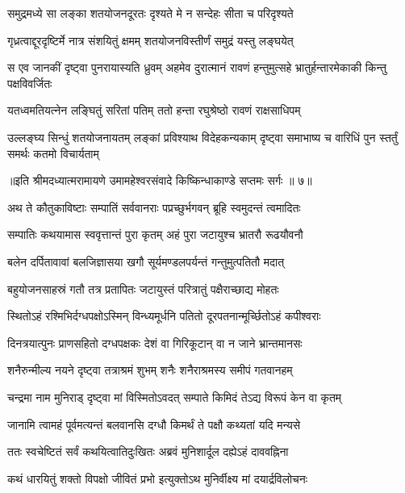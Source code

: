 \twolineshloka
{समुद्रमध्ये सा लङ्का शतयोजनदूरतः}
{दृश्यते मे न सन्देहः सीता च परिदृश्यते} %

\twolineshloka
{गृध्रत्वाद्दूरदृष्टिर्मे नात्र संशयितुं क्षमम्}
{शतयोजनविस्तीर्णं समुद्रं यस्तु लङ्घयेत्} %

\threelineshloka
{स एव जानकीं दृष्ट्वा पुनरायास्यति ध्रुवम्}
{अहमेव दुरात्मानं रावणं हन्तुमुत्सहे}
{भ्रातुर्हन्तारमेकाकी किन्तु पक्षविवर्जितः} %

\twolineshloka
{यतध्वमतियत्नेन लङ्घितुं सरितां पतिम्}
{ततो हन्ता रघुश्रेष्ठो रावणं राक्षसाधिपम्} %

\fourlineindentedshloka
{उल्लङ्घ्य सिन्धुं शतयोजनायतम्}
{लङ्कां प्रविश्याथ विदेहकन्यकाम्}
{दृष्ट्वा समाभाष्य च वारिधिं पुन\-}
{स्तर्तुं समर्थः कतमो विचार्यताम्} %

{॥इति श्रीमदध्यात्मरामायणे उमामहेश्वरसंवादे किष्किन्धाकाण्डे
सप्तमः सर्गः ॥ ७॥
}




\twolineshloka
{अथ ते कौतुकाविष्टाः सम्पातिं सर्ववानराः}
{पप्रच्छुर्भगवन् ब्रूहि स्वमुदन्तं त्वमादितः} %

\twolineshloka
{सम्पातिः कथयामास स्ववृत्तान्तं पुरा कृतम्}
{अहं पुरा जटायुश्च भ्रातरौ रूढयौवनौ} %

\twolineshloka
{बलेन दर्पितावावां बलजिज्ञासया खगौ}
{सूर्यमण्डलपर्यन्तं गन्तुमुत्पतितौ मदात्} %

\twolineshloka
{बहुयोजनसाहस्रं गतौ तत्र प्रतापितः}
{जटायुस्तं परित्रातुं पक्षैराच्छाद्य मोहतः} %

\twolineshloka
{स्थितोऽहं रश्मिभिर्दग्धपक्षोऽस्मिन् विन्ध्यमूर्धनि}
{पतितो दूरपतनान्मूर्च्छितोऽहं कपीश्वराः} %

\twolineshloka
{दिनत्रयात्पुनः प्राणसहितो दग्धपक्षकः}
{देशं वा गिरिकूटान् वा न जाने भ्रान्तमानसः} %

\twolineshloka
{शनैरुन्मील्य नयने दृष्ट्वा तत्राश्रमं शुभम्}
{शनैः शनैराश्रमस्य समीपं गतवानहम्} %

\twolineshloka
{चन्द्रमा नाम मुनिराड् दृष्ट्वा मां विस्मितोऽवदत्}
{सम्पाते किमिदं तेऽद्य विरूपं केन वा कृतम्} %

\twolineshloka
{जानामि त्वामहं पूर्वमत्यन्तं बलवानसि}
{दग्धौ किमर्थं ते पक्षौ कथ्यतां यदि मन्यसे} %

\twolineshloka
{ततः स्वचेष्टितं सर्वं कथयित्वातिदुःखितः}
{अब्रवं मुनिशार्दूल दह्येऽहं दाववह्निना} %

\twolineshloka
{कथं धारयितुं शक्तो विपक्षो जीवितं प्रभो}
{इत्युक्तोऽथ मुनिर्वीक्ष्य मां दयार्द्रविलोचनः} %

